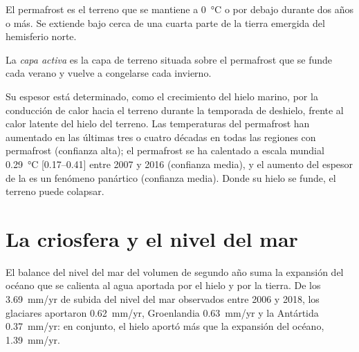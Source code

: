 El permafrost es el terreno que se mantiene a \qty{0}{\celsius} o por debajo durante dos años
o más. Se extiende bajo cerca de una cuarta parte de la tierra emergida del
hemisferio norte.

\begin{definition}\label{def:b3:glaciology:permafrost}
La \emph{capa activa} es la capa de terreno situada sobre
el permafrost que se funde cada verano y vuelve a congelarse cada invierno.
\end{definition}

Su espesor está determinado, como el crecimiento del hielo marino, por la conducción de calor
hacia el terreno durante la temporada de deshielo, frente al calor latente del
hielo del terreno. Las temperaturas del permafrost han aumentado en las últimas tres o
cuatro décadas en todas las regiones con permafrost (confianza alta);
el permafrost se ha calentado a escala mundial \qty{0.29}{\celsius} [\numrange{0.17}{0.41}]
entre 2007 y 2016 (confianza media), y el aumento del
espesor de la  es un fenómeno panártico (confianza media).
Donde su hielo se funde, el terreno puede colapsar.

\section{La criosfera y el nivel del mar}\label{sec:b3:glaciology:sea-level}

El balance del nivel del mar del volumen de segundo año suma la expansión del océano que se
calienta al agua aportada por el hielo y por la tierra. De los
\qty{3.69}{mm/yr} de subida del nivel del mar observados entre 2006 y 2018, los glaciares
aportaron \qty{0.62}{mm/yr}, Groenlandia \qty{0.63}{mm/yr} y la Antártida
\qty{0.37}{mm/yr}: en conjunto, el hielo aportó más que la expansión del océano,
\qty{1.39}{mm/yr}.

